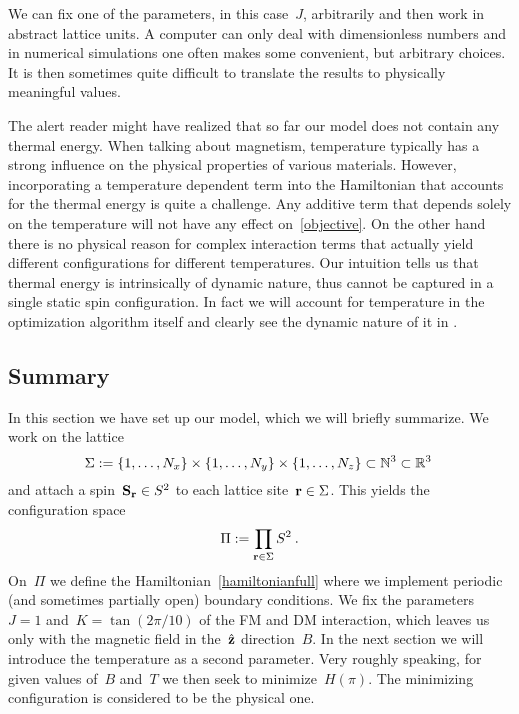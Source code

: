 We can fix one of the parameters, in this case~$J$, arbitrarily and then work in
abstract lattice units. A computer can only deal with dimensionless numbers and
in numerical simulations one often makes some convenient, but arbitrary choices.
It is then sometimes quite difficult to translate the results to physically
meaningful values.

The alert reader might have realized that so far our model does not contain any
thermal energy. When talking about magnetism, temperature typically has a strong
influence on the physical properties of various materials. However,
incorporating a temperature dependent term into the Hamiltonian that accounts
for the thermal energy is quite a challenge. Any additive term that depends
solely on the temperature will not have any effect on~\eqref{objective}. On the
other hand there is no physical reason for complex interaction terms that
actually yield different configurations for different temperatures. Our
intuition tells us that thermal energy is intrinsically of dynamic nature, thus
cannot be captured in a single static spin configuration. In fact we will
account for temperature in the optimization algorithm itself and clearly see the
dynamic nature of it in .

\subsection{Summary}

In this section we have set up our model, which we will briefly summarize. We
work on the lattice
%
\begin{equation}
  \Sigma := \{1,\dots,N_x\} \times \{1,\dots,N_y\} \times
  \{1,\dots,N_z\} \subset \mathbb{N}^3 \subset \mathbb{R}^3\:
\end{equation}
%
and attach a spin~$\mathbf{S}_{\mathbf{r}} \in S^2$ to each lattice site~$\mathbf{r} \in \Sigma$. This
yields the configuration space
%
\begin{equation}
  \Pi := \prod_{\mathbf{r} \in \Sigma} S^2\:.
\end{equation}
%
On~$\Pi$ we define the Hamiltonian~\eqref{hamiltonianfull} where we implement
periodic (and sometimes partially open) boundary conditions. We fix the
parameters~$J=1$ and~$K=\tan(2\pi / 10)$ of the FM and DM interaction, which
leaves us only with the magnetic field in the~$\hat{\mathbf{z}}$ direction~$B$. In the next
section we will introduce the temperature as a second parameter. Very roughly
speaking, for given values of~$B$ and~$T$ we then seek to minimize~$H(\pi)$. The
minimizing configuration is considered to be the physical one.
%
